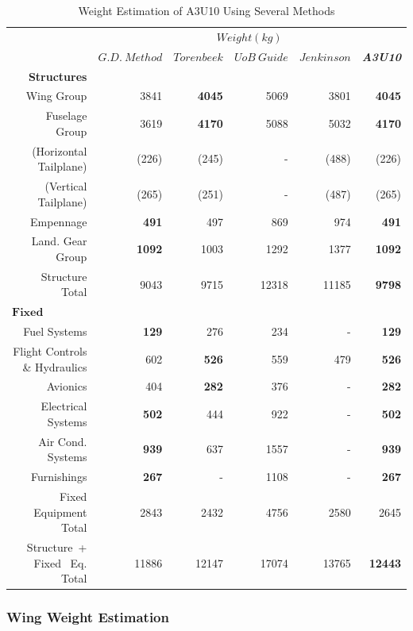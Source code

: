 \documentclass[11pt]{article}
\newcommand{\ra}[1]{\renewcommand{\arraystretch}{#1}}
\newcommand*{\MyIndent}{\hspace*{0.5cm}}%
\begin{document}
\begin{table}[!h]
\centering
\ra{1.3}
\begin{tabular}{@{}rrrrrr@{}}\toprule
& \multicolumn{5}{c}{$Weight (kg)$}\\
\cmidrule{2-6}
&$G.D. \ Method$&$Torenbeek$&$UoB \ Guide$&$Jenkinson$& \textit{\textbf{A3U10}}\\ \midrule
\textbf{Structures}\\
Wing Group& 3841   & \textbf{4045}& 5069 &3801&\textbf{4045}\\
Fuselage Group&3619&\textbf{4170}& 5088 &5032&\textbf{4170}\\
\MyIndent (Horizontal \ Tailplane)&(226)& (245)& - &(488)&(226)\\
\MyIndent (Vertical \ Tailplane)&(265)&(251)& - &(487)&(265)\\
Empennage&\textbf{491}& 497 & 869 & 974 &\textbf{491}\\
Land. Gear Group&\textbf{1092}&1003&1292&1377&\textbf{1092}\\
\cmidrule{2-6}
Structure \ Total&9043&9715&12318&11185&\textbf{9798}\\
\cmidrule{2-6}
$\textbf{Fixed Equipment}$\\
Fuel Systems&\textbf{129}&276&234&-&\textbf{129}\\
Flight Controls \& Hydraulics&602&\textbf{526}&559&479&\textbf{526}\\
Avionics&404&\textbf{282}&376&-&\textbf{282}\\
Electrical Systems&\textbf{502}&444&922&-&\textbf{502}\\
Air Cond. Systems&\textbf{939}&637&1557&-&\textbf{939}\\
Furnishings&\textbf{267}& - &1108&-&\textbf{267}\\
\cmidrule{2-6}
Fixed \ Equipment \ Total&2843&2432&4756&2580&2645 \\
\cmidrule{1-6}
Structure\ + Fixed \ Eq. Total&11886&12147&17074&13765&\textbf{12443}\\

\bottomrule
\end{tabular}
\caption{Weight Estimation of A3U10 Using Several Methods}
\label{table:w_est}
\end{table}

\FloatBarrier



\subsubsection{Wing Weight Estimation}
\end{document}
